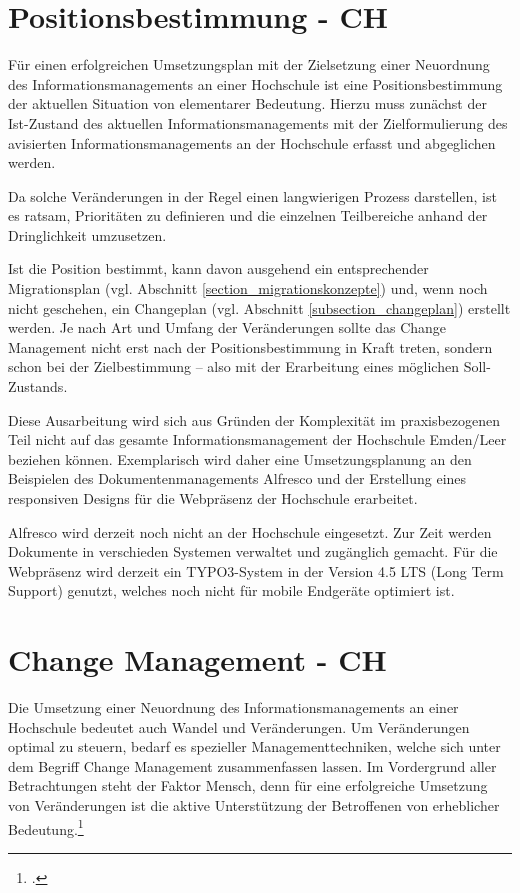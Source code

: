 \section{Positionsbestimmung - CH}
Für einen erfolgreichen Umsetzungsplan mit der Zielsetzung einer Neuordnung des Informationsmanagements an einer Hochschule ist eine Positionsbestimmung der aktuellen Situation von elementarer Bedeutung. Hierzu muss zunächst der Ist-Zustand des aktuellen Informationsmanagements mit der Zielformulierung des avisierten Informationsmanagements an der Hochschule erfasst und abgeglichen werden. 

Da solche Veränderungen in der Regel einen langwierigen Prozess darstellen, ist es ratsam, Prioritäten zu definieren und die einzelnen Teilbereiche anhand der Dringlichkeit umzusetzen.

Ist die Position bestimmt, kann davon ausgehend ein entsprechender Migrationsplan (vgl. Abschnitt \ref{section_migrationskonzepte}) und, wenn noch nicht geschehen, ein Changeplan (vgl. Abschnitt \ref{subsection_changeplan}) erstellt werden. Je nach Art und Umfang der Veränderungen sollte das Change Management nicht erst nach der Positionsbestimmung in Kraft treten, sondern schon bei der Zielbestimmung – also mit der Erarbeitung eines möglichen Soll-Zustands.

Diese Ausarbeitung wird sich aus Gründen der Komplexität im praxisbezogenen Teil nicht auf das gesamte Informationsmanagement der Hochschule Emden/Leer beziehen können. Exemplarisch wird daher eine Umsetzungsplanung an den Beispielen des Dokumentenmanagements Alfresco und der Erstellung eines responsiven Designs für die Webpräsenz der Hochschule erarbeitet.

Alfresco wird derzeit noch nicht an der Hochschule eingesetzt. Zur Zeit werden Dokumente in verschieden Systemen verwaltet und zugänglich gemacht. Für die Webpräsenz wird derzeit ein TYPO3-System in der Version 4.5 LTS (Long Term Support) genutzt, welches noch nicht für mobile Endgeräte optimiert ist.

\section{Change Management - CH}
\label{section_changemanagement}
Die Umsetzung einer Neuordnung des Informationsmanagements an einer Hochschule bedeutet auch Wandel und Veränderungen. Um Veränderungen optimal zu steuern, bedarf es spezieller Managementtechniken, welche sich unter dem Begriff Change Management zusammenfassen lassen. Im Vordergrund aller Betrachtungen steht der Faktor Mensch, denn für eine erfolgreiche Umsetzung von Veränderungen ist die aktive Unterstützung der Betroffenen von erheblicher Bedeutung.\footcite[Vgl.][]{lauer_change_2014}

